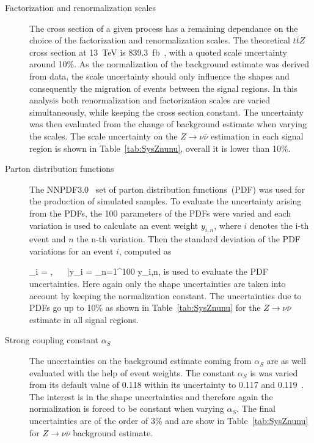 \begin{description}
\item[Factorization and renormalization scales]
The cross section of a given process has a remaining dependance on the choice of the factorization and renormalization scales. The theoretical $t\bar{t}Z$ cross section at 13~TeV is 839.3~fb~\cite{deFlorian:2016spz}, with a quoted scale uncertainty around 10\%. As the normalization of the background estimate was derived from data, the scale uncertainty should only influence the shapes and consequently the migration of events between the signal regions. In this analysis both renormalization and factorization scales are varied simultaneously, while keeping the cross section constant. The uncertainty was then evaluated from the change of background estimate when varying the scales. The scale uncertainty on the $Z \to \nu \bar{\nu}$ estimation in each signal region is shown in Table~\ref{tab:SysZnunu}, overall it is lower than 10\%.


\item[Parton distribution functions]
The NNPDF3.0~\cite{Ball:2014uwa} set of parton distribution functions~(PDF) was used for the production of simulated samples. To evaluate the uncertainty arising from the PDFs, the 100 parameters of the PDFs were varied and each variation is used to calculate an event weight $y_{i,n}$, where $i$ denotes the i-th event and $n$ the n-th variation. Then the standard deviation of the PDF variations for an event $i$, computed as

{
\sigma_{i} = , ~~ \bar{y}_{i} =  \sum_{n=1}^{100} y_{i,n},
}
is used to evaluate the PDF uncertainties. Here again only the shape uncertainties are taken into account by keeping the normalization constant. The uncertainties due to PDFs go up to 10\% as shown in Table~\ref{tab:SysZnunu} for the $Z \to \nu \bar{\nu}$ estimate in all signal regions.

\item[Strong coupling constant $\alpha_{S}$]
The uncertainties on the background estimate coming from $\alpha_{S}$ are as well evaluated with the help of event weights. The constant $\alpha_{S}$ is was varied from its default value of 0.118  within its uncertainty to 0.117 and 0.119~\cite{Patrignani:2016xqp}.  The interest is in the shape uncertainties and therefore again the normalization is forced to be constant when varying $\alpha_{S}$. The final uncertainties are of the order of 3\% and are show in Table~\ref{tab:SysZnunu} for $Z \to \nu \bar{\nu}$ background estimate.
\end{description}

